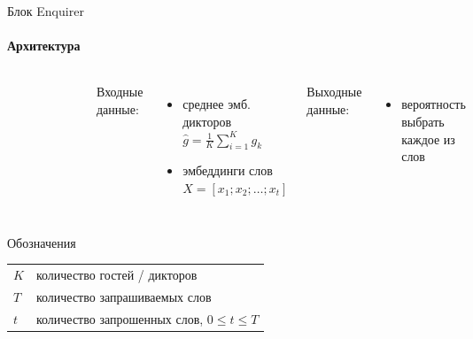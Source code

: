 \documentclass{beamer}
\begin{document}
\begin{frame}{Блок Enquirer}
\framesubtitle{Архитектура}
    \begin{columns}
    
    \begin{figure}[bht]
    \includegraphics[width=.9\textwidth]{enquirer.png}
    \end{figure}

    Входные данные:
    \begin{itemize}
        \item среднее эмб. дикторов\\
            $\hat{g} = \frac{1}{K}{\sum_{i=1}^{K}{g_k}}$
        \item эмбеддинги слов\\
            $X = [x_1; x_2; \ldots; x_t]$
    \end{itemize}
    Выходные данные:
    \begin{itemize}
        \item вероятность выбрать каждое из слов
    \end{itemize}

    \end{columns}

    \begin{block}{Обозначения}
    \begin{tabular}{l l}
        $K$ & количество гостей / дикторов\\
        $T$ & количество запрашиваемых слов\\
        $t$ & количество запрошенных слов, $0 \leq t \leq T$
    \end{tabular}
    \end{block}
\end{frame}
\end{document}
